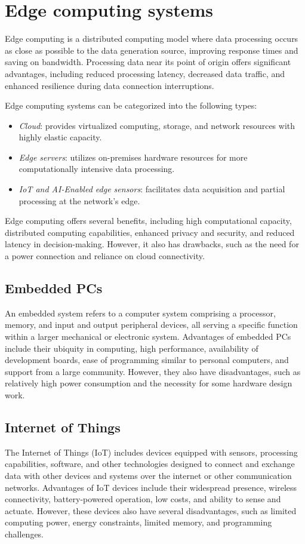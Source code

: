 \section{Edge computing systems}

Edge computing is a distributed computing model where data processing occurs as close as possible to the data generation source, improving response times and saving on bandwidth. 
Processing data near its point of origin offers significant advantages, including reduced processing latency, decreased data traffic, and enhanced resilience during data connection interruptions.

Edge computing systems can be categorized into the following types:
\begin{itemize}
    \item \textit{Cloud}: provides virtualized computing, storage, and network resources with highly elastic capacity.
    \item \textit{Edge servers}: utilizes on-premises hardware resources for more computationally intensive data processing.
    \item \textit{IoT and AI-Enabled edge sensors}: facilitates data acquisition and partial processing at the network's edge.
\end{itemize}

Edge computing offers several benefits, including high computational capacity, distributed computing capabilities, enhanced privacy and security, and reduced latency in decision-making. 
However, it also has drawbacks, such as the need for a power connection and reliance on cloud connectivity.

\subsection{Embedded PCs}
An embedded system refers to a computer system comprising a processor, memory, and input and output peripheral devices, all serving a specific function within a larger mechanical or electronic system. 
Advantages of embedded PCs include their ubiquity in computing, high performance, availability of development boards, ease of programming similar to personal computers, and support from a large community. 
However, they also have disadvantages, such as relatively high power consumption and the necessity for some hardware design work.

\subsection{Internet of Things}
The Internet of Things (IoT) includes devices equipped with sensors, processing capabilities, software, and other technologies designed to connect and exchange data with other devices and systems over the internet or other communication networks. 
Advantages of IoT devices include their widespread presence, wireless connectivity, battery-powered operation, low costs, and ability to sense and actuate. 
However, these devices also have several disadvantages, such as limited computing power, energy constraints, limited memory, and programming challenges.